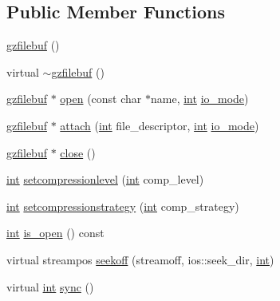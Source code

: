 \subsection*{Public Member Functions}
\begin{DoxyCompactItemize}
\item 
\mbox{\hyperlink{classgzfilebuf_aa08da094521bfa645427c0ae4c851504}{gzfilebuf}} ()
\item 
virtual \mbox{\hyperlink{classgzfilebuf_a51d564cf535b373940d6cfc19c0710dc}{$\sim$gzfilebuf}} ()
\item 
\mbox{\hyperlink{classgzfilebuf}{gzfilebuf}} $\ast$ \mbox{\hyperlink{classgzfilebuf_ae1fbc989b2dae79dba798556542c147c}{open}} (const char $\ast$name, \mbox{\hyperlink{ioapi_8h_a787fa3cf048117ba7123753c1e74fcd6}{int}} \mbox{\hyperlink{classgzfilebuf_a30b7bb833856a68054d8aec490a8c735}{io\+\_\+mode}})
\item 
\mbox{\hyperlink{classgzfilebuf}{gzfilebuf}} $\ast$ \mbox{\hyperlink{classgzfilebuf_a3ececdeaa35a8b606182cc23c9908891}{attach}} (\mbox{\hyperlink{ioapi_8h_a787fa3cf048117ba7123753c1e74fcd6}{int}} file\+\_\+descriptor, \mbox{\hyperlink{ioapi_8h_a787fa3cf048117ba7123753c1e74fcd6}{int}} \mbox{\hyperlink{classgzfilebuf_a30b7bb833856a68054d8aec490a8c735}{io\+\_\+mode}})
\item 
\mbox{\hyperlink{classgzfilebuf}{gzfilebuf}} $\ast$ \mbox{\hyperlink{classgzfilebuf_a18e628926f455f41d7715c2ddd9c0e64}{close}} ()
\item 
\mbox{\hyperlink{ioapi_8h_a787fa3cf048117ba7123753c1e74fcd6}{int}} \mbox{\hyperlink{classgzfilebuf_a8bbfda3e29baf20e4330e3a9d7ee4a54}{setcompressionlevel}} (\mbox{\hyperlink{ioapi_8h_a787fa3cf048117ba7123753c1e74fcd6}{int}} comp\+\_\+level)
\item 
\mbox{\hyperlink{ioapi_8h_a787fa3cf048117ba7123753c1e74fcd6}{int}} \mbox{\hyperlink{classgzfilebuf_a47d4b9f1257fd12dd21847b71ad1d49d}{setcompressionstrategy}} (\mbox{\hyperlink{ioapi_8h_a787fa3cf048117ba7123753c1e74fcd6}{int}} comp\+\_\+strategy)
\item 
\mbox{\hyperlink{ioapi_8h_a787fa3cf048117ba7123753c1e74fcd6}{int}} \mbox{\hyperlink{classgzfilebuf_af2619b96e3ddea9050be70dd21de4752}{is\+\_\+open}} () const
\item 
virtual streampos \mbox{\hyperlink{classgzfilebuf_a0ab89070031cbc37679365582180ae3c}{seekoff}} (streamoff, ios\+::seek\+\_\+dir, \mbox{\hyperlink{ioapi_8h_a787fa3cf048117ba7123753c1e74fcd6}{int}})
\item 
virtual \mbox{\hyperlink{ioapi_8h_a787fa3cf048117ba7123753c1e74fcd6}{int}} \mbox{\hyperlink{classgzfilebuf_ae537a3f86b37de7bf27d2aff0cded07e}{sync}} ()

\end{DoxyCompactItemize}
